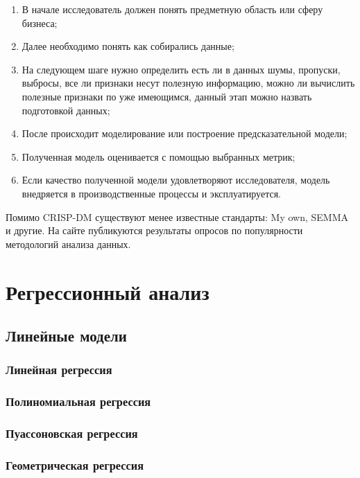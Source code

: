 \begin{enumerate}[label=\arabic*.]
    \item В начале исследователь должен понять предметную область или сферу бизнеса;
    \item Далее необходимо понять как собирались данные;
    \item На следующем шаге нужно определить есть ли в данных шумы, пропуски, выбросы, все ли признаки несут полезную информацию, можно ли вычислить полезные признаки по уже имеющимся, данный этап можно назвать подготовкой данных;
    \item После происходит моделирование или построение предсказательной модели;
    \item Полученная модель оценивается с помощью выбранных метрик;
    \item Если качество полученной модели удовлетворяют исследователя, модель внедряется в производственные процессы и эксплуатируется.
\end{enumerate}
Помимо CRISP-DM существуют менее известные стандарты: My own, SEMMA и другие. На сайте \cite{poll:crisp_dm} публикуются результаты опросов по популярности методологий анализа данных.

\section{Регрессионный анализ}


\subsection{Линейные модели}

\subsubsection{Линейная регрессия}

\subsubsection{Полиномиальная регрессия}

\subsubsection{Пуассоновская регрессия}

\subsubsection{Геометрическая регрессия}

